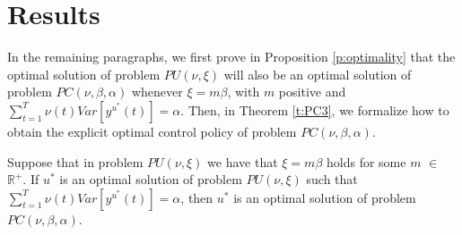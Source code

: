 \chapter{Results} \label{chap:res}

In the remaining paragraphs, we first prove in Proposition \ref{p:optimality} that the optimal solution of problem $PU(\nu,\xi)$ will also be an optimal solution of problem $PC(\nu,\beta,\alpha)$ whenever $\xi=m \beta$, with $m$ positive and $\sum_{t=1}^{T} \nu(t)Var\left[y^{u^*}(t)\right] = \alpha$.
Then, in Theorem \ref{t:PC3}, we formalize how to obtain the explicit optimal control policy of problem $PC(\nu,\beta,\alpha)$. %

\begin{proposition} \label{p:optimality}
    Suppose that in problem $PU(\nu,\xi)$ we have that $\xi=m\beta$ holds for some $m$ $\in$ $\mathbb{R^+}$.
    If $u^{*}$ is an optimal solution of problem $PU(\nu,\xi)$ such that
        $\sum_{t=1}^{T} \nu(t)Var\left[y^{u^*}(t)\right] = \alpha$,
    then $u^{*}$ is an optimal solution of problem $PC(\nu,\beta,\alpha)$.
\end{proposition}

